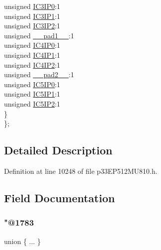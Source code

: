 \begin{DoxyCompactItemize}
\begin{tabbing}
\>\>unsigned \hyperlink{structtag_i_p_c9_b_i_t_s_a31711af8d06a88d9c0b704bca2b94ad0}{IC3IP0}:1\\
\>\>unsigned \hyperlink{structtag_i_p_c9_b_i_t_s_ab0dfc63576a66c626e376a02af2b5edc}{IC3IP1}:1\\
\>\>unsigned \hyperlink{structtag_i_p_c9_b_i_t_s_a2716771026cf3f40f11e9e8195bbc777}{IC3IP2}:1\\
\>\>unsigned \hyperlink{structtag_i_p_c9_b_i_t_s_acaf2d0924a107ec6e8d2e31febaf66f9}{\_\_pad1\_\_}:1\\
\>\>unsigned \hyperlink{structtag_i_p_c9_b_i_t_s_a2725c209c9292649bf160735ec884b21}{IC4IP0}:1\\
\>\>unsigned \hyperlink{structtag_i_p_c9_b_i_t_s_a02e537ad95c5d7f4a4a59d993f6655c9}{IC4IP1}:1\\
\>\>unsigned \hyperlink{structtag_i_p_c9_b_i_t_s_abd1919706fc4bc726a0d3ea0010a143d}{IC4IP2}:1\\
\>\>unsigned \hyperlink{structtag_i_p_c9_b_i_t_s_a4d97cc5f7d51d22fc2bf3eab35c9cb7f}{\_\_pad2\_\_}:1\\
\>\>unsigned \hyperlink{structtag_i_p_c9_b_i_t_s_ab45df8b6966e9ea22d4b1de239635281}{IC5IP0}:1\\
\>\>unsigned \hyperlink{structtag_i_p_c9_b_i_t_s_ad146babfbec2d02bf869aa6c288ffb58}{IC5IP1}:1\\
\>\>unsigned \hyperlink{structtag_i_p_c9_b_i_t_s_a06e62bdb23c0c2f96ae41aa18c076fec}{IC5IP2}:1\\
\>\} \\
\}; \\

\end{tabbing}\end{DoxyCompactItemize}


\subsection{Detailed Description}


Definition at line 10248 of file p33\+E\+P512\+M\+U810.\+h.



\subsection{Field Documentation}
\mbox{\label{structtag_i_p_c9_b_i_t_s_a607199a1e20b394f268da432086397fb}} 
\subsubsection{\texorpdfstring{"@1783}{@1783}}
{\footnotesize\ttfamily union \{ ... \} }

